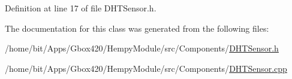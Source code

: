 Definition at line 17 of file D\+H\+T\+Sensor.\+h.



The documentation for this class was generated from the following files\+:\begin{DoxyCompactItemize}
\item 
/home/bit/\+Apps/\+Gbox420/\+Hempy\+Module/src/\+Components/\hyperlink{_hempy_module_2src_2_components_2_d_h_t_sensor_8h}{D\+H\+T\+Sensor.\+h}\item 
/home/bit/\+Apps/\+Gbox420/\+Hempy\+Module/src/\+Components/\hyperlink{_hempy_module_2src_2_components_2_d_h_t_sensor_8cpp}{D\+H\+T\+Sensor.\+cpp}\end{DoxyCompactItemize}
